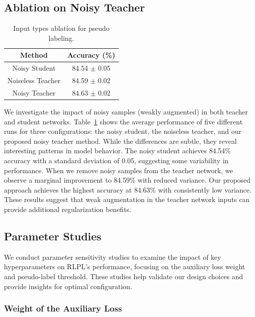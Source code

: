 \subsection{Ablation on Noisy Teacher}

\begin{table}[!htbp]
\centering
\begin{tabular}{cc}
\hline
\textbf{Method} & \textbf{Accuracy (\%)} \\
\hline
Noisy Student    & 84.54 $\pm$ 0.05 \\
Noiseless Teacher & 84.59 $\pm$ 0.02 \\
Noisy Teacher     & 84.63 $\pm$ 0.02 \\
\hline
\end{tabular}
\caption{Input types ablation for pseudo labeling.}
\label{table:noise}
\end{table}
We investigate the impact of noisy samples (weakly augmented) in both teacher and student networks. Table~\ref{table:noise} shows the average performance of five different runs for three configurations: the noisy student, the noiseless teacher, and our proposed noisy teacher method. While the differences are subtle, they reveal interesting patterns in model behavior. The noisy student achieves 84.54\% accuracy with a standard deviation of 0.05, suggesting some variability in performance. When we remove noisy samples from the teacher network, we observe a marginal improvement to 84.59\% with reduced variance. Our proposed approach achieves the highest accuracy at 84.63\% with consistently low variance. These results suggest that weak augmentation in the teacher network inputs can provide additional regularization benefits.


\subsection{Parameter Studies}

We conduct parameter sensitivity studies to examine the impact of key hyperparameters on RLPL's performance, focusing on the auxiliary loss weight and pseudo-label threshold. These studies help validate our design choices and provide insights for optimal configuration.

\subsubsection{Weight of the Auxiliary Loss}

